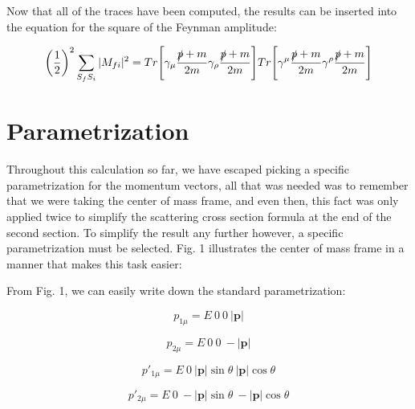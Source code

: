 \documentclass[a4]{article}
\begin{document}
    Now that all of the traces have been computed, the results can be inserted into the equation for the square of the Feynman amplitude:

    \begin{framed}
        \begin{eqnarray}
            \bigg( \frac{1}{2} \bigg)^2 \sum_{S_f S_i} |M_{f i}|^2 = Tr \Bigg[ \gamma_{\mu} \frac{\slashed{p} + m}{2m} \gamma_{\rho} \frac{\slashed{p} + m}{2m} \Bigg] Tr \Bigg[ \gamma^{\mu} \frac{\slashed{p} + m}{2m} \gamma^{\rho} \frac{\slashed{p} + m}{2m} \Bigg]
        \end{eqnarray}
    \end{framed}

    \section*{Parametrization}

    Throughout this calculation so far, we have escaped picking a specific parametrization for the momentum vectors, all that was needed was to remember that we were taking the center of mass frame, and even then, this fact was only applied twice to simplify
    the scattering cross section formula at the end of the second section. To simplify the result any further however, a specific parametrization must be selected. Fig. 1 illustrates the center of mass frame in a manner that makes this task easier:


    From Fig. 1, we can easily write down the standard parametrization: 

    \begin{equation}
        p_{1 \mu} = E \: 0 \: 0 \: |\mathbf{p}|
    \end{equation}
    
    \begin{equation}
        p_{2 \mu} = E \: 0 \: 0 \: - |\mathbf{p}|
    \end{equation}

    \begin{equation}
        p'_{1 \mu} = E \: 0 \: |\mathbf{p}| \sin \theta \: |\mathbf{p}| \cos \theta
    \end{equation}

    \begin{equation}
        p'_{2 \mu} = E \: 0 \: - |\mathbf{p}| \sin \theta \: - |\mathbf{p}| \cos \theta
    \end{equation}
\end{document}
